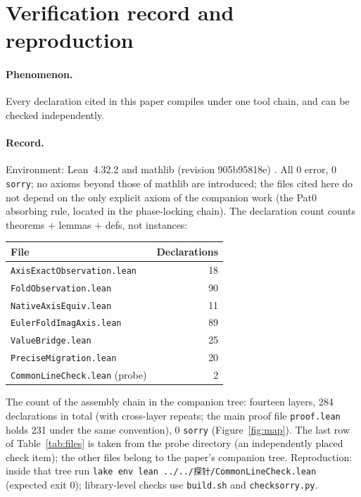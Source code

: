 \documentclass{article}
\renewcommand{\_}{\underscoreOrig\allowbreak}
\begin{document}
\section{Verification record and reproduction}
\label{sec:verify}

\paragraph{Phenomenon.} Every declaration cited in this paper compiles
under one tool chain, and can be checked independently.

\paragraph{Record.} Environment: Lean~4.32.2 and mathlib (revision
905b95818e) \cite{mathlib, lean}. All 0 error, 0 \texttt{sorry}; no
axioms beyond those of mathlib are introduced; the files cited here do
not depend on the only explicit axiom of the companion work (the Pat0
absorbing rule, located in the phase-locking chain). The declaration
count counts theorems $+$ lemmas $+$ defs, not instances:

\begin{center}
\begin{tabular}{lr}
\hline
File & Declarations \\
\hline
\texttt{AxisExactObservation.lean} & 18 \\
\texttt{FoldObservation.lean} & 90 \\
\texttt{NativeAxisEquiv.lean} & 11 \\
\texttt{EulerFoldImagAxis.lean} & 89 \\
\texttt{ValueBridge.lean} & 25 \\
\texttt{PreciseMigration.lean} & 20 \\
\texttt{CommonLineCheck.lean} (probe) & 2 \\
\hline
\end{tabular}
\end{center}
\label{tab:files}
\vspace{6pt}

The count of the assembly chain in the companion tree: fourteen layers,
284 declarations in total (with cross-layer repeats; the main proof file
\texttt{proof.lean} holds 231 under the same convention), 0
\texttt{sorry} (Figure~\ref{fig:map}). The last row of
Table~\ref{tab:files} is taken from the probe directory (an independently
placed check item); the other files belong to the paper's companion
tree. Reproduction: inside that tree run
\texttt{lake env lean ../../探针\_20261010/CommonLineCheck.lean}
(expected exit 0); library-level checks use \texttt{build.sh} and
\texttt{check\_sorry.py}.
\end{document}
